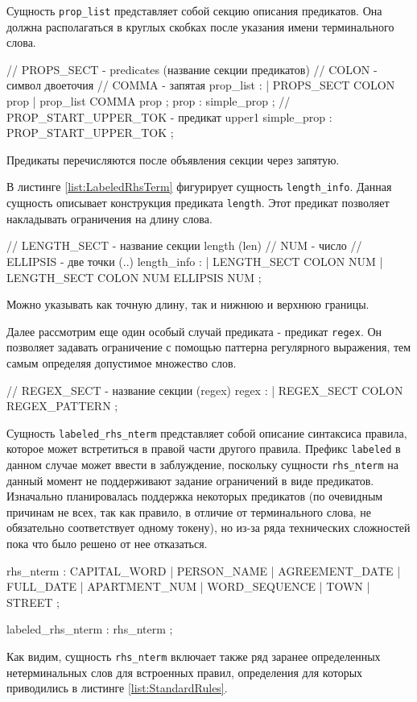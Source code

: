 Сущность \lstinline{prop_list} представляет собой секцию описания предикатов. Она должна располагаться в круглых скобках после указания имени терминального слова.
\begin{Verb}
// PROPS_SECT - predicates (название секции предикатов)
// COLON - символ двоеточия
// COMMA - запятая
prop_list
    : %
    | PROPS_SECT COLON prop
    | prop_list COMMA prop
    ;
prop
    : simple_prop
    ;
// PROP_START_UPPER_TOK - предикат upper1
simple_prop
    : PROP_START_UPPER_TOK
    ;
\end{Verb}
Предикаты перечисляются после объявления секции через запятую.

В листинге \ref{list:LabeledRhsTerm} фигурирует сущность \lstinline{length_info}. Данная сущность описывает конструкция предиката \lstinline{length}. Этот предикат позволяет накладывать ограничения на длину слова.
\begin{Verb}
// LENGTH_SECT - название секции length (len)
// NUM - число
// ELLIPSIS - две точки (..)
length_info
    : %
    | LENGTH_SECT COLON NUM
    | LENGTH_SECT COLON NUM ELLIPSIS NUM
    ;
\end{Verb}
Можно указывать как точную длину, так и нижнюю и верхнюю границы.

Далее рассмотрим еще один особый случай предиката - предикат \lstinline{regex}. Он позволяет задавать ограничение с помощью паттерна регулярного выражения, тем самым определяя допустимое множество слов.
\begin{Verb}
// REGEX_SECT - название секции (regex)
regex
    : %
    | REGEX_SECT COLON REGEX_PATTERN
    ;
\end{Verb}

Сущность \lstinline{labeled_rhs_nterm} представляет собой описание синтаксиса правила, которое может встретиться в правой части другого правила. Префикс \lstinline{labeled} в данном случае может ввести в заблуждение, поскольку сущности \lstinline{rhs_nterm} на данный момент не поддерживают задание ограничений в виде предикатов. Изначально планировалась поддержка некоторых предикатов (по очевидным причинам не всех, так как правило, в отличие от терминального слова, не обязательно соответствует одному токену), но из-за ряда технических сложностей пока что было решено от нее отказаться.
\begin{Verb}
rhs_nterm
    : CAPITAL_WORD
    | PERSON_NAME
    | AGREEMENT_DATE
    | FULL_DATE
    | APARTMENT_NUM
    | WORD_SEQUENCE
    | TOWN
    | STREET
    ;

labeled_rhs_nterm
    : rhs_nterm
    ;
\end{Verb}
Как видим, сущность \lstinline{rhs_nterm} включает также ряд заранее определенных нетерминальных слов для встроенных правил, определения для которых приводились в листинге \ref{list:StandardRules}.

